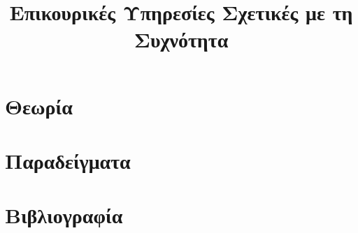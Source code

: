 \title{Επικουρικές Υπηρεσίες Σχετικές με τη Συχνότητα}

\section{Θεωρία}
\label{kef-03-theoria}

\section{Παραδείγματα}
\label{kef-03-paradeigmata}

\section{Βιβλιογραφία}
\label{kef-03-vivliografia}

